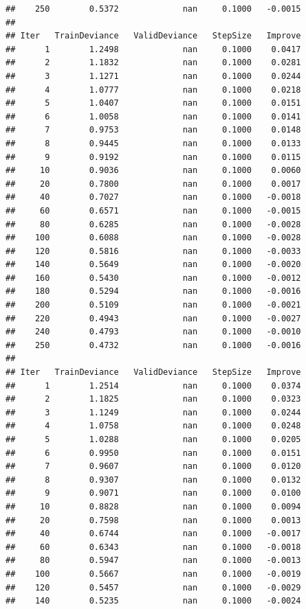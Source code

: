 \documentclass[
]{book}
\begin{document}
\begin{verbatim}
##    250        0.5372             nan     0.1000   -0.0015
## 
## Iter   TrainDeviance   ValidDeviance   StepSize   Improve
##      1        1.2498             nan     0.1000    0.0417
##      2        1.1832             nan     0.1000    0.0281
##      3        1.1271             nan     0.1000    0.0244
##      4        1.0777             nan     0.1000    0.0218
##      5        1.0407             nan     0.1000    0.0151
##      6        1.0058             nan     0.1000    0.0141
##      7        0.9753             nan     0.1000    0.0148
##      8        0.9445             nan     0.1000    0.0133
##      9        0.9192             nan     0.1000    0.0115
##     10        0.9036             nan     0.1000    0.0060
##     20        0.7800             nan     0.1000    0.0017
##     40        0.7027             nan     0.1000   -0.0018
##     60        0.6571             nan     0.1000   -0.0015
##     80        0.6285             nan     0.1000   -0.0028
##    100        0.6088             nan     0.1000   -0.0028
##    120        0.5816             nan     0.1000   -0.0033
##    140        0.5649             nan     0.1000   -0.0020
##    160        0.5430             nan     0.1000   -0.0012
##    180        0.5294             nan     0.1000   -0.0016
##    200        0.5109             nan     0.1000   -0.0021
##    220        0.4943             nan     0.1000   -0.0027
##    240        0.4793             nan     0.1000   -0.0010
##    250        0.4732             nan     0.1000   -0.0016
## 
## Iter   TrainDeviance   ValidDeviance   StepSize   Improve
##      1        1.2514             nan     0.1000    0.0374
##      2        1.1825             nan     0.1000    0.0323
##      3        1.1249             nan     0.1000    0.0244
##      4        1.0758             nan     0.1000    0.0248
##      5        1.0288             nan     0.1000    0.0205
##      6        0.9950             nan     0.1000    0.0151
##      7        0.9607             nan     0.1000    0.0120
##      8        0.9307             nan     0.1000    0.0132
##      9        0.9071             nan     0.1000    0.0100
##     10        0.8828             nan     0.1000    0.0094
##     20        0.7598             nan     0.1000    0.0013
##     40        0.6744             nan     0.1000   -0.0017
##     60        0.6343             nan     0.1000   -0.0018
##     80        0.5947             nan     0.1000   -0.0013
##    100        0.5667             nan     0.1000   -0.0019
##    120        0.5457             nan     0.1000   -0.0029
##    140        0.5235             nan     0.1000   -0.0024

\end{verbatim}
\end{document}
